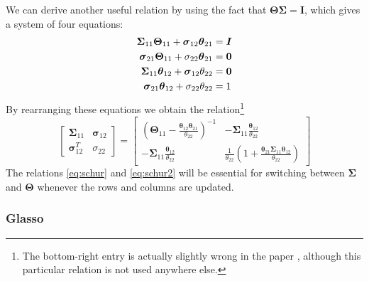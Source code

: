 \documentclass[10pt, letterpaper]{article}
\newcommand{\cov}{\boldsymbol \Sigma}
\newcommand{\scov}{\boldsymbol \sigma}
\newcommand{\sscov}{\sigma}
\newcommand{\preci}{\boldsymbol \Theta}
\newcommand{\spreci}{\boldsymbol \theta} %
\newcommand{\sspreci}{\theta} %
\newcommand{\eye}{\boldsymbol I} %
\newcommand{\bzero}{{\bf 0}}
\begin{document}
We can derive another useful relation by using the fact that $\preci \cov = \eye$, which gives a system of four equations:
\begin{align*}
\cov_{11}\preci_{11} + \scov_{12} \spreci_{21} &= \eye\\
\scov_{21} \preci_{11} + \sscov_{22}\spreci_{21} &= \bzero\\
\cov_{11}\spreci_{12} + \scov_{12}\sspreci_{22} &= \bzero\\
\scov_{21} \spreci_{12} + \sscov_{22} \sspreci_{22} &= 1
\end{align*}
By rearranging these equations we obtain the relation\footnote{The bottom-right entry is actually slightly wrong in the paper \cite{MH}, although this particular relation is not used anywhere else.}
\begin{equation}
\begin{bmatrix}
\cov_{11} & \scov_{12}\\
\scov_{12}^T & \sscov_{22}
\end{bmatrix}
= \begin{bmatrix}
\left( \preci_{11} - \frac{\spreci_{12}\spreci_{21}}{\sspreci_{22}} \right)^{-1} 
& -\cov_{11} \frac{\spreci_{12}}{\sspreci_{22}} \\[8pt]
-\cov_{11} \frac{\spreci_{12}}{\sspreci_{22}}
& \frac{1}{\sspreci_{22}}\left( 1 + \frac{ \spreci_{21} \cov_{11} \spreci_{12} }{\sspreci_{22}}  \right)
\end{bmatrix}
\label{eq:schur2}
\end{equation}
The relations \ref{eq:schur} and \ref{eq:schur2} will be essential for switching between $\cov$ and $\preci$ whenever the rows and columns are updated.



\subsubsection{Glasso}
\end{document}

